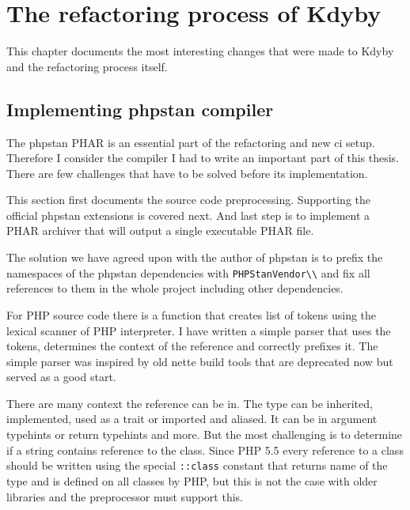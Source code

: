 \chapter{The refactoring process of Kdyby}

This chapter documents the most interesting changes that were made to Kdyby and the refactoring process itself.

\section{Implementing \gls{phpstan} compiler}

The \gls{phpstan} PHAR is an essential part of the refactoring and new \gls{ci} setup. Therefore I consider the compiler I had to write an important part of this thesis. There are few challenges that have to be solved before its implementation.

This section first documents the source code preprocessing. Supporting the official \gls{phpstan} extensions is covered next. And last step is to implement a PHAR archiver that will output a single executable PHAR file.

 \label{sec:refactoring:phpstan-preprocessor}

The solution we have agreed upon with the author of \gls{phpstan} is to prefix the namespaces of the \gls{phpstan} dependencies with \lstinline{PHPStanVendor\\} and fix all references to them in the whole project including other dependencies.

For PHP source code there is a function  that creates list of tokens using the lexical scanner of PHP interpreter. I have written a simple parser that uses the tokens, determines the context of the reference and correctly prefixes it. The simple parser was inspired by old \gls{nette} build tools that are deprecated now but served as a good start.

There are many context the reference can be in. The type can be inherited, implemented, used as a trait or imported and aliased. It can be in argument typehints or return typehints and more. But the most challenging is to determine if a string contains reference to the class. Since PHP 5.5 every reference to a class should be written using the special \lstinline{::class} constant that returns name of the type and is defined on all classes by PHP, but this is not the case with older libraries and the preprocessor must support this.

